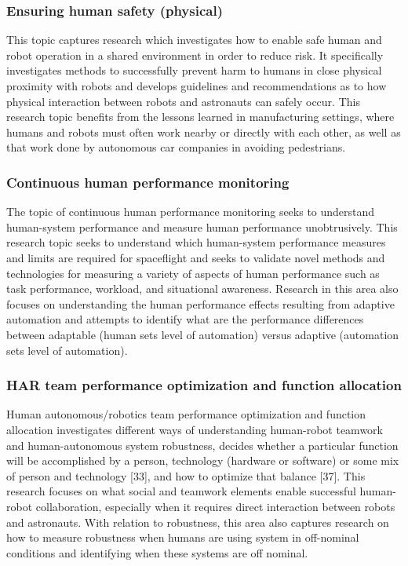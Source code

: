 \subsubsection{Ensuring human safety (physical)}
This topic captures research which investigates how to enable safe human and robot operation in a shared environment in order to reduce risk. It specifically investigates methods to successfully prevent harm to humans in close physical proximity with robots and develops guidelines and recommendations as to how physical interaction between robots and astronauts can safely occur. This research topic benefits from the lessons learned in manufacturing settings, where humans and robots must often work nearby or directly with each other, as well as that work done by autonomous car companies in avoiding pedestrians.

\subsubsection{Continuous human performance monitoring}
The topic of continuous human performance monitoring seeks to understand human-system performance and measure human performance unobtrusively. This research topic seeks to understand which human-system performance measures and limits are required for spaceflight and seeks to validate novel methods and technologies for measuring a variety of aspects of human performance such as task performance, workload, and situational awareness. Research in this area also focuses on understanding the human performance effects resulting from adaptive automation and attempts to identify what are the performance differences between adaptable (human sets level of automation) versus adaptive (automation sets level of automation).

\subsubsection{HAR team performance optimization and function allocation}
Human autonomous/robotics team performance optimization and function allocation investigates different ways of understanding human-robot teamwork and human-autonomous system robustness, decides whether a particular function will be accomplished by a person, technology (hardware or software) or some mix of person and technology [33], and how to optimize that balance [37]. This research focuses on what social and teamwork elements enable successful human-robot collaboration, especially when it requires direct interaction between robots and astronauts. With relation to robustness, this area also captures research on how to measure robustness when humans are using system in off-nominal conditions and identifying when these systems are off nominal.

